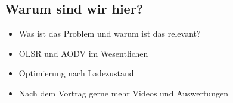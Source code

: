 \documentclass[11pt,landscape]{beamer}
\begin{document}




\subsection{Warum sind wir hier?}

\begin{frame}{\insertsubsection}
\begin{itemize}
\item Was ist das Problem und warum ist das relevant?\newline
\item OLSR und AODV im Wesentlichen\newline
\item Optimierung nach Ladezustand\newline
\item Nach dem Vortrag gerne mehr Videos und Auswertungen
\end{itemize}
\end{frame}
\end{document}
